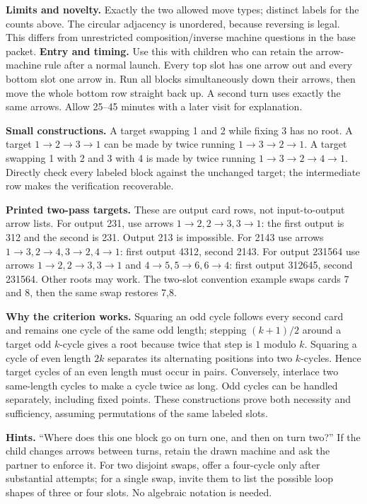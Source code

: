 \textbf{Limits and novelty.} Exactly the two allowed move types; distinct labels for the counts above. The circular adjacency is unordered, because reversing is legal. This differs from unrestricted composition/inverse machine questions in the base packet.
\newpage
{}
\textbf{Entry and timing.} Use this with children who can retain the arrow-machine rule after a normal launch. Every top slot has one arrow out and every bottom slot one arrow in. Run all blocks simultaneously down their arrows, then move the whole bottom row straight back up. A second turn uses exactly the same arrows. Allow 25--45 minutes with a later visit for explanation.

\textbf{Small constructions.} A target swapping 1 and 2 while fixing 3 has no root. A target $1\to 2\to 3\to 1$ can be made by twice running $1\to 3\to 2\to 1$. A target swapping 1 with 2 and 3 with 4 is made by twice running $1\to 3\to 2\to 4\to 1$. Directly check every labeled block against the unchanged target; the intermediate row makes the verification recoverable.

\textbf{Printed two-pass targets.} These are output card rows, not input-to-output arrow lists. For output 231, use arrows $1\to2,2\to3,3\to1$: the first output is 312 and the second is 231. Output 213 is impossible. For 2143 use arrows $1\to3,2\to4,3\to2,4\to1$: first output 4312, second 2143. For output 231564 use arrows $1\to2,2\to3,3\to1$ and $4\to5,5\to6,6\to4$: first output 312645, second 231564. Other roots may work. The two-slot convention example swaps cards 7 and 8, then the same swap restores 7,8.

\textbf{Why the criterion works.} Squaring an odd cycle follows every second card and remains one cycle of the same odd length; stepping $(k+1)/2$ around a target odd $k$-cycle gives a root because twice that step is $1$ modulo $k$. Squaring a cycle of even length $2 k$ separates its alternating positions into two $k$-cycles. Hence target cycles of an even length must occur in pairs. Conversely, interlace two same-length cycles to make a cycle twice as long. Odd cycles can be handled separately, including fixed points. These constructions prove both necessity and sufficiency, assuming permutations of the same labeled slots.

\textbf{Hints.} ``Where does this one block go on turn one, and then on turn two?'' If the child changes arrows between turns, retain the drawn machine and ask the partner to enforce it. For two disjoint swaps, offer a four-cycle only after substantial attempts; for a single swap, invite them to list the possible loop shapes of three or four slots. No algebraic notation is needed.

